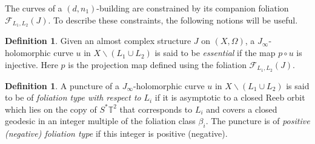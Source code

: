 \documentclass[12pt]{amsart}
\theoremstyle{definition}
\newtheorem{definition}[theorem]{Definition}
\newcommand{\CC}{{\mathbb C}}
\begin{document}
\medskip

The curves of a $(d,n_1)$-building are constrained by its companion foliation $\mathcal{F}_{L_1,L_2}(J)$. To describe these constraints, the following notions will be useful.



\begin{definition}\label{sp}
Given an almost complex structure $J$ on $(X,\Omega)$,
a $J_\infty$-holomorphic curve $u$ in $X \smallsetminus (L_1 \cup L_2)$ is said to be {\em essential} if the map $p \circ u$ is injective. Here $p$ is the projection map defined using the foliation $\mathcal{F}_{L_1,L_2}(J)$.
\end{definition}


\begin{definition}\label{ft}
 A puncture of a $J_\infty$-holomorphic curve $u$ in $X \smallsetminus (L_1 \cup L_2)$ is said to be of {\em foliation type with respect to} $L_i$  if it is asymptotic to a closed Reeb orbit which lies on the copy of $S^*\mathbb{T}^2$ that corresponds to $L_i$ and covers a closed geodesic in an integer multiple of the foliation class $\beta_i$. The puncture is of {\em positive (negative) foliation type} if this integer is positive (negative).
\end{definition}






\end{document}
